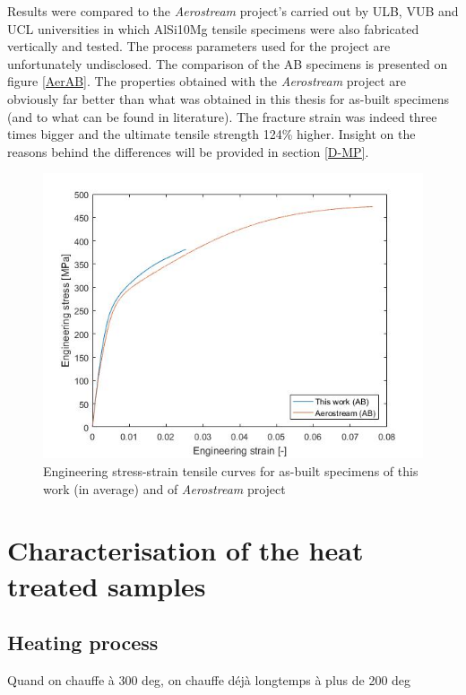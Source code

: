 Results were compared to the \textit{Aerostream} project's carried out by ULB, VUB and UCL universities in which AlSi10Mg tensile specimens were also fabricated vertically and tested. The process parameters used for the project are unfortunately undisclosed. The comparison of the AB specimens is presented on figure \ref{AerAB}. The properties obtained with the \textit{Aerostream} project are obviously far better than what was obtained in this thesis for as-built specimens (and to what can be found in literature). The fracture strain was indeed three times bigger and the ultimate tensile strength 124\% higher. Insight on the reasons behind the differences will be provided in section \ref{D-MP}.

\begin{figure}[ht]
	\centering
	\centerline{\includegraphics[scale=0.64]{Images/AerAB}}
	\decoRule
	\caption[Engineering stress-strain tensile curves for as-built specimens of this work (in average) and of \textit{Aerostream} project]{Engineering stress-strain tensile curves for as-built specimens of this work (in average) and of \textit{Aerostream} project}
	\label{fig:AerAB}
\end{figure}




\section{Characterisation of the heat treated samples}

\subsection{Heating process}
Quand on chauffe à 300 deg, on chauffe déjà longtemps à plus de 200 deg

